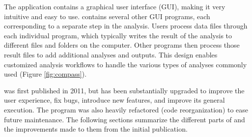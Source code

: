 The application contains a graphical user interface (GUI), making it very intuitive and easy to use. \compass{}  contains several other GUI programs, each corresponding to a separate step in the analysis. Users process data files through each individual program, which typically writes the result of the analysis to different files and folders on the computer. Other programs then process those result files to add additional analyses and outputs. This design enables customized analysis workflows to handle the various types of analyses commonly used (Figure \ref{fig:compass}).

\compass{} was first published in 2011, but has been substantially upgraded to improve the user experience, fix bugs, introduce new features, and improve its general execution. The program was also heavily refactored (code reorganization) to ease future maintenance. The following sections summarize the different parts of \compass{} and the improvements made to them from the initial publication.
 
